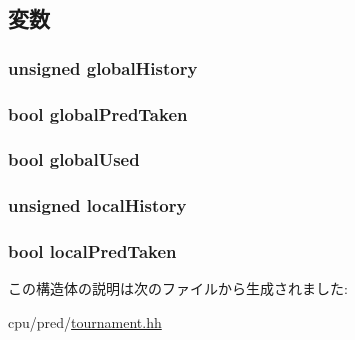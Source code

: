 \subsection{変数}
\hypertarget{structTournamentBP_1_1BPHistory_a48805f17e95aa944cb6eda2fcf061adf}{
\subsubsection[{globalHistory}]{\setlength{\rightskip}{0pt plus 5cm}unsigned {\bf globalHistory}}}
\label{structTournamentBP_1_1BPHistory_a48805f17e95aa944cb6eda2fcf061adf}
\hypertarget{structTournamentBP_1_1BPHistory_a763776bd09694368843a75e358d9ad2f}{
\subsubsection[{globalPredTaken}]{\setlength{\rightskip}{0pt plus 5cm}bool {\bf globalPredTaken}}}
\label{structTournamentBP_1_1BPHistory_a763776bd09694368843a75e358d9ad2f}
\hypertarget{structTournamentBP_1_1BPHistory_a32f4254e16ae5ad5e8fe606127986427}{
\subsubsection[{globalUsed}]{\setlength{\rightskip}{0pt plus 5cm}bool {\bf globalUsed}}}
\label{structTournamentBP_1_1BPHistory_a32f4254e16ae5ad5e8fe606127986427}
\hypertarget{structTournamentBP_1_1BPHistory_abd1ecd91e08530456ca48f9f9ee37ae1}{
\subsubsection[{localHistory}]{\setlength{\rightskip}{0pt plus 5cm}unsigned {\bf localHistory}}}
\label{structTournamentBP_1_1BPHistory_abd1ecd91e08530456ca48f9f9ee37ae1}
\hypertarget{structTournamentBP_1_1BPHistory_a3079bd6e296cf8dc0c0ddb8613b9143d}{
\subsubsection[{localPredTaken}]{\setlength{\rightskip}{0pt plus 5cm}bool {\bf localPredTaken}}}
\label{structTournamentBP_1_1BPHistory_a3079bd6e296cf8dc0c0ddb8613b9143d}


この構造体の説明は次のファイルから生成されました:\begin{DoxyCompactItemize}
\item 
cpu/pred/\hyperlink{tournament_8hh}{tournament.hh}\end{DoxyCompactItemize}
